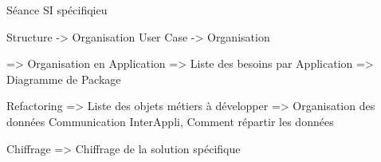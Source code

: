 Séance SI spécifiqieu

Structure -> Organisation
User Case -> Organisation

=> Organisation en Application
=> Liste des besoins par Application
=> Diagramme de Package

Refactoring
=> Liste des objets métiers à développer
=> Organisation des données {Communication InterAppli, Comment répartir les données}

Chiffrage
=> Chiffrage de la solution spécifique
